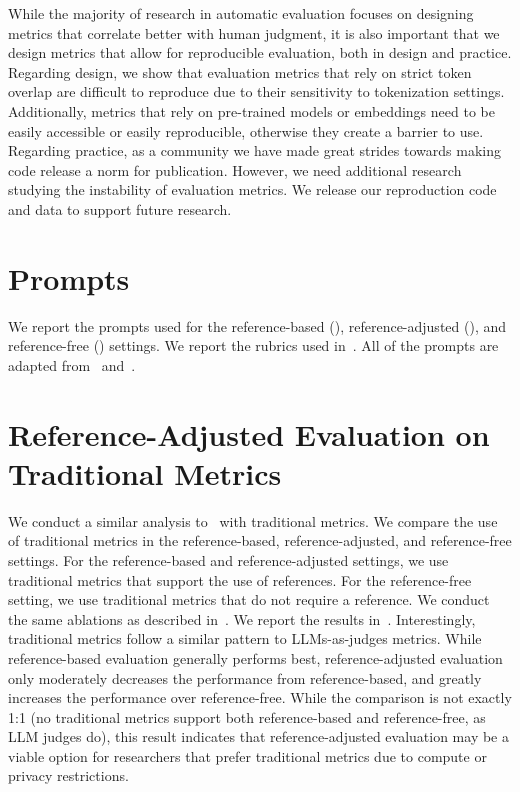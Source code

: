 While the majority of research in automatic evaluation focuses on designing metrics that correlate better with human judgment, it is also important that we design metrics that allow for reproducible evaluation, both in design and practice. Regarding design, we show that evaluation metrics that rely on strict token overlap are difficult to reproduce due to their sensitivity to tokenization settings. Additionally, metrics that rely on pre-trained models or embeddings need to be easily accessible or easily reproducible, otherwise they create a barrier to use. Regarding practice, as a community we have made great strides towards making code release a norm for publication. However, we need additional research studying the instability of evaluation metrics. We release our reproduction code and data to support future research.







\section{Prompts}\label{sec:6-chapter-prompts}
We report the prompts used for the reference-based (), reference-adjusted (), and reference-free () settings. We report the rubrics used in~. All of the prompts are adapted from~\textcite{Kim2023Prometheus} and~\textcite{fabbri-etal-2021-summeval}.


\section{Reference-Adjusted Evaluation on Traditional Metrics}\label{sec:6-appendix-trad-ref-eval}
We conduct a similar analysis to~ with traditional metrics. We compare the use of traditional metrics in the reference-based, reference-adjusted, and reference-free settings. For the reference-based and reference-adjusted settings, we use traditional metrics that support the use of references. For the reference-free setting, we use traditional metrics that do not require a reference. We conduct the same ablations as described in~. We report the results in~. Interestingly, traditional metrics follow a similar pattern to LLMs-as-judges metrics. While reference-based evaluation generally performs best, reference-adjusted evaluation only moderately decreases the performance from reference-based, and greatly increases the performance over reference-free. While the comparison is not exactly 1:1 (no traditional metrics support both reference-based and reference-free, as LLM judges do), this result indicates that reference-adjusted evaluation may be a viable option for researchers that prefer traditional metrics due to compute or privacy restrictions.  


